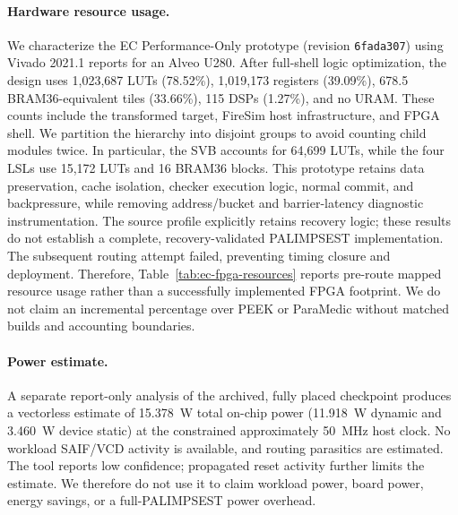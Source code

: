 \paragraph{Hardware resource usage.}
We characterize the EC Performance-Only prototype (revision
\texttt{6fada307}) using Vivado 2021.1 reports for an Alveo U280.
After full-shell logic optimization, the design uses 1,023,687 LUTs
(78.52\%), 1,019,173 registers (39.09\%), 678.5 BRAM36-equivalent
tiles (33.66\%), 115 DSPs (1.27\%), and no URAM.
These counts include the transformed target, FireSim host infrastructure,
and FPGA shell. We partition the hierarchy into disjoint groups to avoid
counting child modules twice. In particular, the SVB accounts for 64,699 LUTs,
while the four LSLs use 15,172 LUTs and 16 BRAM36 blocks.
This prototype retains data preservation, cache isolation, checker execution
logic, normal commit, and backpressure, while removing address/bucket and
barrier-latency diagnostic instrumentation. The source profile explicitly
retains recovery logic; these results do not establish a complete,
recovery-validated PALIMPSEST implementation.
The subsequent routing attempt failed, preventing timing closure and
deployment. Therefore, Table~\ref{tab:ec-fpga-resources} reports
pre-route mapped resource usage rather than a successfully implemented
FPGA footprint. We do not claim an incremental percentage over PEEK or
ParaMedic without matched builds and accounting boundaries.

\paragraph{Power estimate.}
A separate report-only analysis of the archived, fully placed checkpoint
produces a vectorless estimate of 15.378~W total on-chip power
(11.918~W dynamic and 3.460~W device static)
at the constrained approximately 50~MHz host clock. No workload SAIF/VCD
activity is available, and routing parasitics are estimated. The tool reports
low confidence; propagated reset activity further limits the estimate.
We therefore do not use it to claim workload power, board power,
energy savings, or a full-PALIMPSEST power overhead.

